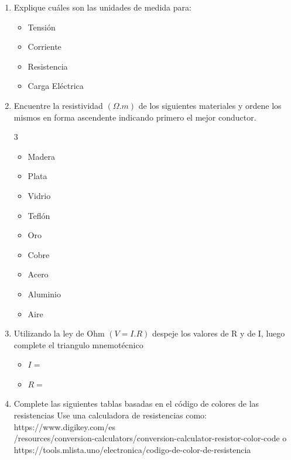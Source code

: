 \documentclass{article}
\begin{document}
\begin{enumerate}[label=\textbf{A.\arabic*}]
		\item Explique cuáles son las unidades de medida para:
			\begin{itemize}
				\item Tensión
				\item Corriente
				\item Resistencia
				\item Carga Eléctrica
			\end{itemize}
		\item Encuentre la resistividad $(\Omega . m)$  de los siguientes materiales y ordene los mismos en forma ascendente indicando primero el mejor conductor. 
		\begin{multicols}{3}
		\begin{itemize}
			\item Madera
			\item Plata
			\item Vidrio
			\item Teflón
			\item Oro
			\item Cobre
			\item Acero
			\item Aluminio
			\item Aire
		\end{itemize}
	\end{multicols}
	   \item Utilizando la ley de Ohm $(V = I . R)$ despeje los valores de R y de I, luego complete el triangulo mnemotécnico\\
	   \begin{minipage}{.45\textwidth}
	   \begin{itemize}
	   	\item $I=$
	   	\item $R=$
	   \end{itemize}
   		\end{minipage}
   	\begin{minipage}{.55\textwidth}
	  
	\end{minipage}
	 \item 
	   Complete las siguientes tablas basadas en el código de colores de las resistencias
	   Use una calculadora de resistencias como: https://www.digikey.com/es\\/resources/conversion-calculators/conversion-calculator-resistor-color-code o \\ https://tools.mlista.uno/electronica/codigo-de-color-de-resistencia
	   \\
	    

\end{enumerate}
\end{document}
